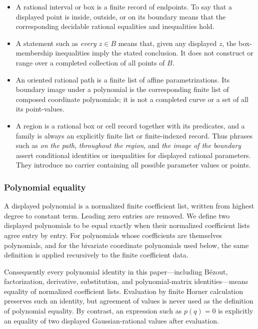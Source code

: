 \documentclass[11pt]{article}
\begin{document}
\begin{itemize}
\item A rational interval or box is a finite record of endpoints.  To say
that a displayed point is inside, outside, or on its boundary means that the
corresponding decidable rational equalities and inequalities hold.

\item A statement such as \emph{every $z\in B$} means that, given any
displayed $z$, the box-membership inequalities imply the stated conclusion.
It does not construct or range over a completed collection of all points of
$B$.

\item An oriented rational path is a finite list of affine
parametrizations.  Its boundary image under a polynomial is the corresponding
finite list of composed coordinate polynomials; it is not a completed curve
or a set of all its point-values.

\item A region is a rational box or cell record together with its predicates,
and a family is always an explicitly finite list or finite-indexed record.
Thus phrases such as \emph{on the path}, \emph{throughout the region}, and
\emph{the image of the boundary} assert conditional identities or
inequalities for displayed rational parameters.  They introduce no carrier
containing all possible parameter values or points.
\end{itemize}

\subsubsection{Polynomial equality}
\label{sec:polynomial-equality}

A displayed polynomial is a normalized finite coefficient list, written from
highest degree to constant term.  Leading zero entries are removed.  We
define two displayed polynomials to be equal exactly when their normalized
coefficient lists agree entry by entry.  For polynomials whose coefficients
are themselves polynomials, and for the bivariate coordinate polynomials
used below, the same definition is applied recursively to the finite
coefficient data.

Consequently every polynomial identity in this paper---including B\'ezout,
factorization, derivative, substitution, and polynomial-matrix
identities---means equality of normalized coefficient lists.  Evaluation by
finite Horner calculation preserves such an identity, but agreement of
values is never used as the definition of polynomial equality.  By contrast,
an expression such as $p(q)=0$ is explicitly an equality of two displayed
Gaussian-rational values after evaluation.
\end{document}
